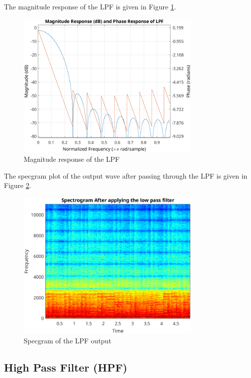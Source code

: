 \documentclass[a4paper,12pt]{article}
\begin{document}
The magnitude response of the LPF is given in Figure \ref{fig:magnitudeLPF}.
\begin{figure}[h]
    \centering
    \includegraphics[width=0.8\textwidth]{figs/magLPF.png}
    \caption{Magnitude response of the LPF}
    \label{fig:magnitudeLPF}
\end{figure}

The specgram plot of the output wave after passing through the LPF is given in Figure \ref{fig:specgramLPF}.
\begin{figure}[h]
    \centering
    \includegraphics[width=0.8\textwidth]{figs/specLPF.png}
    \caption{Specgram of the LPF output}
    \label{fig:specgramLPF}
\end{figure}

\subsection*{High Pass Filter (HPF)}
\end{document}
